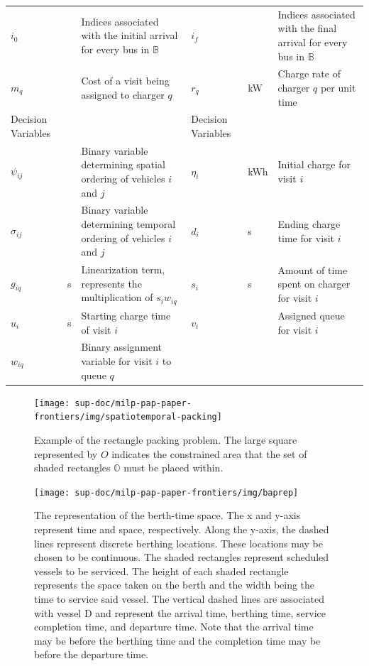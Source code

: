 \documentclass[ee,thesis]{usuthesis}
\begin{document}
\begin{landscape}
\begin{table}[htbp]
\begin{tabularx}{\paperwidth}{L{0.2} L{0.12} L{0.8} L{0.2} L{0.12} L{0.8}}
\(i_0\) &  & Indices associated with the initial arrival for every bus in \(\mathbb{B}\) & \(i_f\) &  & Indices associated with the final arrival for every bus in \(\mathbb{B}\)\\[0pt]
\(m_q\) &  & Cost of a visit being assigned to charger \(q\) & \(r_q\) & kW & Charge rate of charger \(q\) per unit time\\[0pt]
\hline
Decision Variables &  &  & Decision Variables &  & \\[0pt]
\(\psi_{ij}\) &  & Binary variable determining spatial ordering of vehicles \(i\) and \(j\) & \(\eta_i\) & kWh & Initial charge for visit \(i\)\\[0pt]
\(\sigma_{ij}\) &  & Binary variable determining temporal ordering of vehicles \(i\) and \(j\) & \(d_i\) & s & Ending charge time for visit \(i\)\\[0pt]
\(g_{iq}\) & s & Linearization term, represents the multiplication of \(s_i w_{iq}\) & \(s_i\) & s & Amount of time spent on charger for visit \(i\)\\[0pt]
\(u_i\) & s & Starting charge time of visit \(i\) & \(v_i\) &  & Assigned queue for visit \(i\)\\[0pt]
\(w_{iq}\) &  & Binary assignment variable for visit \(i\) to queue \(q\) &  &  & \\[0pt]
\hline
\end{tabularx}
\end{table}
\end{landscape}

\begin{figure}[htpb]
\centering
    \texttt{[image: sup-doc/milp-pap-paper-frontiers/img/spatiotemporal-packing]}
    \caption{Example of the rectangle packing problem. The large square represented by $O$ indicates the constrained
      area that the set of shaded rectangles $\mathbb{O}$ must be placed within.}
    \label{fig:packexample}
\end{figure}

\begin{figure}[ht]
\centering
    \texttt{[image: sup-doc/milp-pap-paper-frontiers/img/baprep]}
    \caption{The representation of the berth-time space. The x and y-axis represent time and space, respectively. Along
      the y-axis, the dashed lines represent discrete berthing locations. These locations may be chosen to be
      continuous. The shaded rectangles represent scheduled vessels to be serviced. The height of each shaded rectangle
      represents the space taken on the berth and the width being the time to service said vessel. The vertical dashed
      lines are associated with vessel D and represent the arrival time, berthing time, service completion time, and
      departure time. Note that the arrival time may be before the berthing time and the completion time may be before
      the departure time.}
    \label{fig:bap}
\end{figure}
\end{document}
